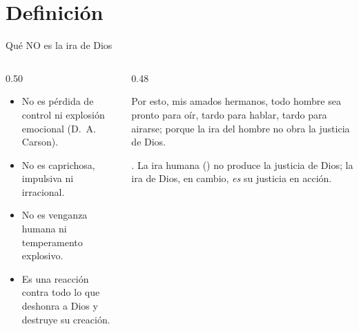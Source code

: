 \section{Definición}

\begin{frame}{Qué NO es la ira de Dios}
\begin{columns}[t,onlytextwidth]
\begin{column}{0.50\textwidth}\small
\begin{itemize}
\item No es pérdida de control ni explosión emocional (D.~A. Carson).
\item No es caprichosa, impulsiva ni irracional.
\item No es venganza humana ni temperamento explosivo.
\item Es una reacción  contra todo lo que deshonra a Dios y destruye su creación.
\end{itemize}
\end{column}
\begin{column}{0.48\textwidth}
\begin{cita}Por esto, mis amados hermanos, todo hombre sea pronto para oír, tardo para hablar, tardo para airarse; porque la ira del hombre no obra la justicia de Dios.\end{cita}
\scriptsize{}. La ira humana () no produce la justicia de Dios; la ira de Dios, en cambio, \emph{es} su justicia en acción.
\end{column}
\end{columns}
\end{frame}

